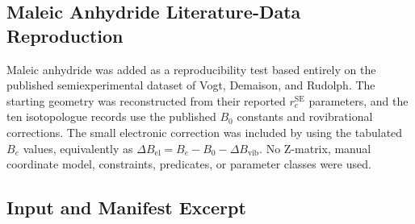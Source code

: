 \documentclass[12pt]{article}
\begin{document}
\subsection{Maleic Anhydride Literature-Data Reproduction}

Maleic anhydride was added as a reproducibility test based entirely on the
published semiexperimental dataset of Vogt, Demaison, and Rudolph. The
starting geometry was reconstructed from their reported $r_e^\mathrm{SE}$
parameters, and the ten isotopologue records use the published $B_0$
constants and rovibrational corrections. The small electronic correction was
included by using the tabulated $B_e$ values, equivalently as
$\Delta B_\mathrm{el}=B_e-B_0-\Delta B_\mathrm{vib}$. No Z-matrix, manual
coordinate model, constraints, predicates, or parameter classes were used.

\subsection{Input and Manifest Excerpt}
\end{document}
